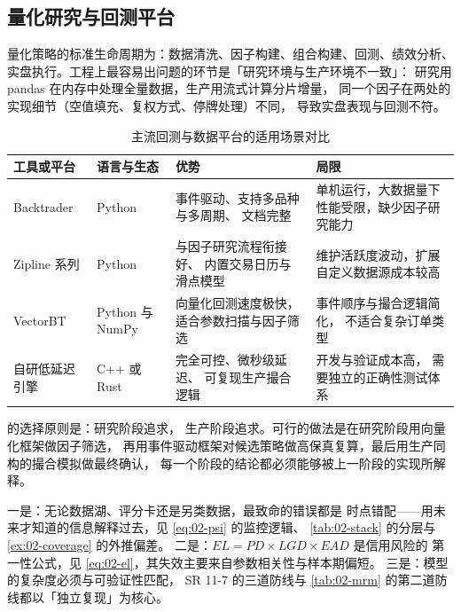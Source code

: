 \subsection{量化研究与回测平台}

量化策略的标准生命周期为：数据清洗、因子构建、组合构建、回测、绩效分析、
实盘执行。工程上最容易出问题的环节是「研究环境与生产环境不一致」：
研究用 pandas 在内存中处理全量数据，生产用流式计算分片增量，
同一个因子在两处的实现细节（空值填充、复权方式、停牌处理）不同，
导致实盘表现与回测不符。

\begin{table}[htbp]
\centering
\caption{主流回测与数据平台的适用场景对比}\label{tab:02-backtest}
\tablefont
\begin{tabular}{@{}L{2.6cm}L{3.4cm}L{4.2cm}L{4.2cm}@{}}
\toprule
工具或平台 & 语言与生态 & 优势 & 局限 \\
\midrule
Backtrader & Python & 事件驱动、支持多品种与多周期、
 文档完整 & 单机运行，大数据量下性能受限，缺少因子研究能力 \\
Zipline 系列 & Python & 与因子研究流程衔接好、
 内置交易日历与滑点模型 & 维护活跃度波动，扩展自定义数据源成本较高 \\
VectorBT & Python 与 NumPy & 向量化回测速度极快，
 适合参数扫描与因子筛选 & 事件顺序与撮合逻辑简化，
 不适合复杂订单类型 \\
自研低延迟引擎 & C++ 或 Rust & 完全可控、微秒级延迟、
 可复现生产撮合逻辑 & 开发与验证成本高，
 需要独立的正确性测试体系 \\
\bottomrule
\end{tabular}
\end{table}

 的选择原则是：研究阶段追求，
生产阶段追求。可行的做法是在研究阶段用向量化框架做因子筛选，
再用事件驱动框架对候选策略做高保真复算，最后用生产同构的撮合模拟做最终确认，
每一个阶段的结论都必须能够被上一阶段的实现所解释。

\begin{keybox}[本章的三条主线]
一是：无论数据湖、评分卡还是另类数据，最致命的错误都是
时点错配——用未来才知道的信息解释过去，见 \cref{eq:02-psi} 的监控逻辑、
\cref{tab:02-stack} 的分层与 \cref{ex:02-coverage} 的外推偏差。
二是：$EL = PD \times LGD \times EAD$ 是信用风险的
第一性公式，见 \cref{eq:02-el}，其失效主要来自参数相关性与样本期偏短。
三是：模型的复杂度必须与可验证性匹配，
SR 11-7 的三道防线与 \cref{tab:02-mrm} 的第二道防线都以「独立复现」为核心。
\end{keybox}

